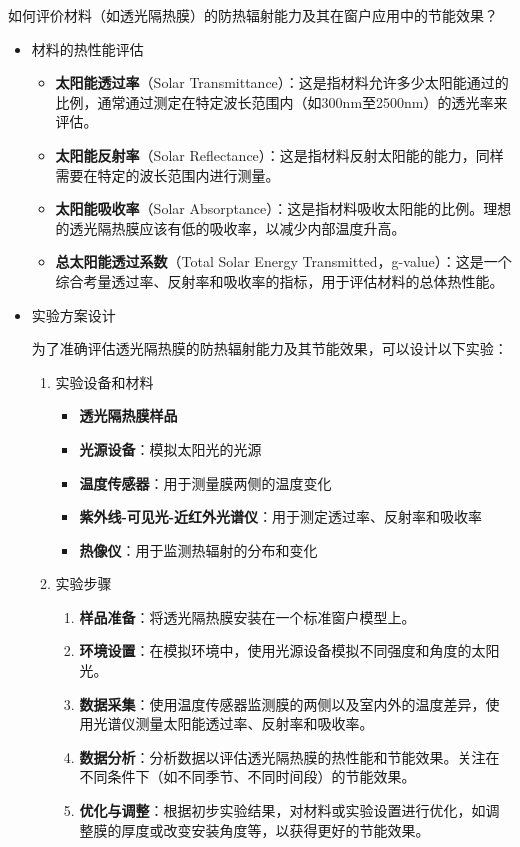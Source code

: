 \documentclass[dvipsnames, svgnames,a4paper,11pt]{article}
\begin{document}
	
	\begin{question}
		如何评价材料（如透光隔热膜）的防热辐射能力及其在窗户应用中的节能效果？
	\end{question}
	\begin{itemize}
		\item 材料的热性能评估
		\begin{itemize}
			\item \textbf{太阳能透过率}（Solar Transmittance）：这是指材料允许多少太阳能通过的比例，通常通过测定在特定波长范围内（如300nm至2500nm）的透光率来评估。
			\item \textbf{太阳能反射率}（Solar Reflectance）：这是指材料反射太阳能的能力，同样需要在特定的波长范围内进行测量。
			\item \textbf{太阳能吸收率}（Solar Absorptance）：这是指材料吸收太阳能的比例。理想的透光隔热膜应该有低的吸收率，以减少内部温度升高。
			\item \textbf{总太阳能透过系数}（Total Solar Energy Transmitted，g-value）：这是一个综合考量透过率、反射率和吸收率的指标，用于评估材料的总体热性能。
		\end{itemize}
		
		\item 实验方案设计
		
		为了准确评估透光隔热膜的防热辐射能力及其节能效果，可以设计以下实验：
		
		\begin{enumerate}
			\item 实验设备和材料
			\begin{itemize}
				\item \textbf{透光隔热膜样品}
				\item \textbf{光源设备}：模拟太阳光的光源
				\item \textbf{温度传感器}：用于测量膜两侧的温度变化
				\item \textbf{紫外线-可见光-近红外光谱仪}：用于测定透过率、反射率和吸收率
				\item \textbf{热像仪}：用于监测热辐射的分布和变化
			\end{itemize}
			
			\item 实验步骤
			\begin{enumerate}
				\item \textbf{样品准备}：将透光隔热膜安装在一个标准窗户模型上。
				\item \textbf{环境设置}：在模拟环境中，使用光源设备模拟不同强度和角度的太阳光。
				\item \textbf{数据采集}：使用温度传感器监测膜的两侧以及室内外的温度差异，使用光谱仪测量太阳能透过率、反射率和吸收率。
				\item \textbf{数据分析}：分析数据以评估透光隔热膜的热性能和节能效果。关注在不同条件下（如不同季节、不同时间段）的节能效果。
				\item \textbf{优化与调整}：根据初步实验结果，对材料或实验设置进行优化，如调整膜的厚度或改变安装角度等，以获得更好的节能效果。
			\end{enumerate} 
		\end{enumerate}
		

\end{itemize}
\end{document}
